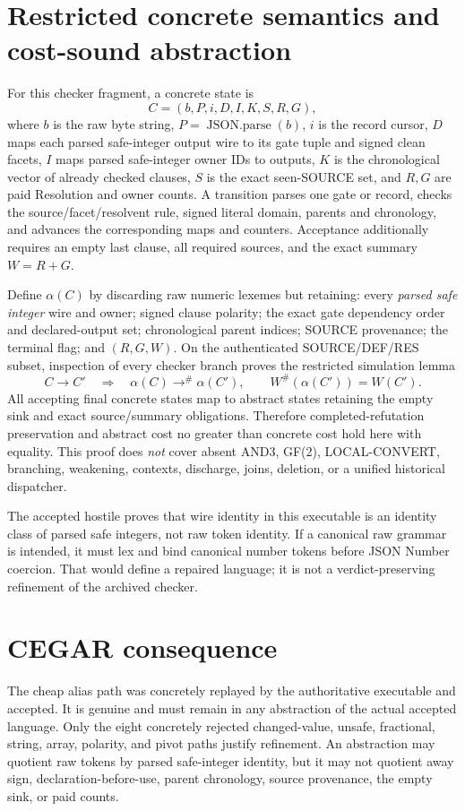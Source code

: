 \documentclass[11pt]{article}
\begin{document}
\section*{Restricted concrete semantics and cost-sound abstraction}
For this checker fragment, a concrete state is
\[
 C=(b,P,i,D,I,K,S,R,G),
\]
where $b$ is the raw byte string, $P=\operatorname{JSON.parse}(b)$, $i$ is the
record cursor, $D$ maps each parsed safe-integer output wire to its gate tuple
and signed clean facets, $I$ maps parsed safe-integer owner IDs to outputs,
$K$ is the chronological vector of already checked clauses, $S$ is the exact
seen-SOURCE set, and $R,G$ are paid Resolution and owner counts.  A transition
parses one gate or record, checks the source/facet/resolvent rule, signed literal
domain, parents and chronology, and advances the corresponding maps and
counters.  Acceptance additionally requires an empty last clause, all required
sources, and the exact summary $W=R+G$.

Define $\alpha(C)$ by discarding raw numeric lexemes but retaining: every
\emph{parsed safe integer} wire and owner; signed clause polarity; the exact
gate dependency order and declared-output set; chronological parent indices;
SOURCE provenance; the terminal flag; and $(R,G,W)$.  On the authenticated
SOURCE/DEF/RES subset, inspection of every checker branch proves the restricted
simulation lemma
\[
 C\to C'\quad\Longrightarrow\quad \alpha(C)\to^{\#}\alpha(C'),
 \qquad W^{\#}(\alpha(C'))=W(C').
\]
All accepting final concrete states map to abstract states retaining the empty
sink and exact source/summary obligations.  Therefore completed-refutation
preservation and abstract cost no greater than concrete cost hold here with
equality.  This proof does \emph{not} cover absent AND3, GF(2), LOCAL-CONVERT,
branching, weakening, contexts, discharge, joins, deletion, or a unified
historical dispatcher.

The accepted hostile proves that wire identity in this executable is an
identity class of parsed safe integers, not raw token identity.  If a canonical
raw grammar is intended, it must lex and bind canonical number tokens before
JSON Number coercion.  That would define a repaired language; it is not a
verdict-preserving refinement of the archived checker.

\section*{CEGAR consequence}
The cheap alias path was concretely replayed by the authoritative executable
and accepted.  It is genuine and must remain in any abstraction of the actual
accepted language.  Only the eight concretely rejected changed-value, unsafe,
fractional, string, array, polarity, and pivot paths justify refinement.  An
abstraction may quotient raw tokens by parsed safe-integer identity, but it may
not quotient away sign, declaration-before-use, parent chronology, source
provenance, the empty sink, or paid counts.
\end{document}
